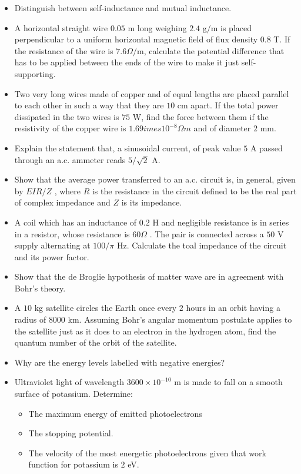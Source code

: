 \documentclass{article}
\begin{document}
\begin{itemize}
\begin{itemize}
\end{itemize}
\item Distinguish between self-inductance and mutual inductance.
\item A horizontal straight wire $ 0.05$ m long weighing $ 2.4$ g$/$m is placed perpendicular to a uniform horizontal magnetic field of flux density $ 0.8$ T.  If the resistance of the wire is $ 7.6\Omega /$m, calculate the potential difference that has to be applied between the ends of the wire to make it just self-supporting.
\item Two very long wires made of copper and of equal lengths are placed parallel to each other in such a way that they are $ 10$ cm apart.  If the total power dissipated in the two wires is $ 75$ W, find the force between them if the resistivity of the copper wire is $ 1.69	imes 10^{-8}\Omega m$ and of diameter $ 2$ mm.
\item Explain the statement that, a sinusoidal current, of peak value $ 5$ A passed through an a.c. ammeter reads $ 5/\sqrt{2}$ A.  
\item Show that the average power transferred to an a.c. circuit is, in general, given by $ EIR/Z$ , where $ R$ is the resistance in the circuit defined to be the real part of complex impedance and $ Z$ is its impedance.
\item A coil which has an inductance of $ 0.2$ H and negligible resistance is in series in a resistor, whose resistance is $ 60\Omega $ . The pair is connected across a $ 50$ V supply alternating at $ 100/\pi$ Hz.  Calculate the toal impedance of the circuit and its power factor.
\item Show that the de Broglie hypothesis of matter wave are in agreement with Bohr’s theory.
\item A $ 10$ kg satellite circles the Earth once every $ 2$ hours in an orbit having a radius of $ 8000$ km.  Assuming Bohr’s angular momentum postulate applies to the satellite just as it does to an electron in the hydrogen atom,  find the quantum number of the orbit of the satellite.
\item Why are the energy levels labelled with negative energies?
\item Ultraviolet light of wavelength $ 3600 \times 10^{-10}$ m is made to fall on a smooth surface of potassium. Determine:
 \begin{itemize}
\item The maximum energy of emitted photoelectrons
\item The stopping potential.
\item The velocity of the most energetic photoelectrons given that work function for potassium is $ 2$ eV.

\end{itemize}
\end{itemize}
\end{document}
